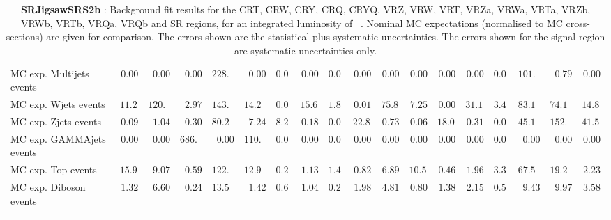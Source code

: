 \begin{table}
{\begin{tabular*}{\textwidth}{@{\extracolsep{\fill}}lrrrrrrrrrrrrrrrrr}
\noalign{\smallskip}\hline\noalign{\smallskip}
        MC exp. Multijets events         & $0.00$          & $0.00$          & $0.00$          & $228.27$          & $0.00$          & $0.00$          & $0.00$          & $0.00$          & $0.00$          & $0.00$          & $0.00$          & $0.00$          & $0.00$          & $0.00$          & $101.13$          & $0.79$          & $0.00$              \\
        MC exp. Wjets events         & $11.24$          & $120.96$          & $2.97$          & $143.24$          & $14.21$          & $0.00$          & $15.64$          & $1.82$          & $0.01$          & $75.82$          & $7.25$          & $0.00$          & $31.12$          & $3.40$          & $83.17$          & $74.16$          & $14.85$              \\
        MC exp. Zjets events         & $0.09$          & $1.04$          & $0.30$          & $80.29$          & $7.24$          & $8.23$          & $0.18$          & $0.02$          & $22.80$          & $0.73$          & $0.06$          & $18.05$          & $0.31$          & $0.03$          & $45.15$          & $152.63$          & $41.56$              \\
        MC exp. GAMMAjets events         & $0.00$          & $0.00$          & $686.01$          & $0.00$          & $110.42$          & $0.00$          & $0.00$          & $0.00$          & $0.00$          & $0.00$          & $0.00$          & $0.00$          & $0.00$          & $0.00$          & $0.00$          & $0.00$          & $0.00$              \\
        MC exp. Top events         & $15.95$          & $9.07$          & $0.59$          & $122.17$          & $12.91$          & $0.22$          & $1.13$          & $1.40$          & $0.82$          & $6.89$          & $10.55$          & $0.46$          & $1.96$          & $3.35$          & $67.50$          & $19.26$          & $2.23$              \\
        MC exp. Diboson events         & $1.32$          & $6.60$          & $0.24$          & $13.53$          & $1.42$          & $0.62$          & $1.04$          & $0.23$          & $1.98$          & $4.81$          & $0.80$          & $1.38$          & $2.15$          & $0.53$          & $9.43$          & $9.97$          & $3.58$              \\
\noalign{\smallskip}\hline\noalign{\smallskip}
\end{tabular*}
}
\caption{{\bf SRJigsawSRS2b} : Background fit results for the CRT, CRW, CRY, CRQ, CRYQ, VRZ, VRW, VRT, VRZa, VRWa, VRTa, VRZb, VRWb, VRTb, VRQa, VRQb and SR regions, for an integrated luminosity of \ourintlumi~\ifb. Nominal MC expectations (normalised to MC cross-sections) are given for comparison. The errors shown are the statistical plus systematic uncertainties. The errors shown for the signal region are systematic uncertainties only.}
\label{table.results.systematics.in.logL.fit.CRT.CRW.CRY.CRQ.CRYQ.VRZ.VRW.VRT.VRZa.VRWa.VRTa.VRZb.VRWb.VRTb.VRQa.VRQb.SR.SRJigsawSRS2b}
\end{table}
%
